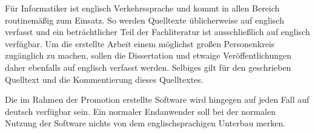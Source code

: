 \documentclass[paper=a4,fontsize=11pt,parskip=half]{scrartcl}
\begin{document}
Für Informatiker ist englisch Verkehrssprache und kommt in allen Bereich routinemäßig zum Einsatz. So werden Quelltexte üblicherweise auf englisch verfasst und ein beträchtlicher Teil der Fachliteratur ist ausschließlich auf englisch verfügbar. Um die erstellte Arbeit einem möglichst großen Personenkreis zugänglich zu machen, sollen die Dissertation und etwaige Veröffentlichungen daher ebenfalls  auf englisch verfasst werden. Selbiges gilt für den geschrieben Quelltext und die Kommentierung dieses Quelltextes.

Die im Rahmen der Promotion erstellte Software wird hingegen auf jeden Fall auf deutsch verfügbar sein. Ein normaler Endanwender soll bei der normalen Nutzung der Software nichts von dem englischsprachigen Unterbau merken.
\end{document}
